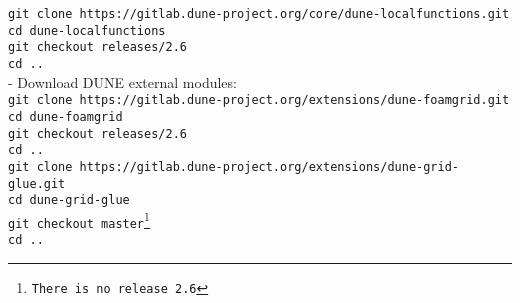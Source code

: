 \texttt{git clone https://gitlab.dune-project.org/core/dune-localfunctions.git}\\
    \hspace{\parindent} \texttt{cd dune-localfunctions}\\
    \hspace{\parindent} \texttt{git checkout releases/2.6}\\
		\hspace{\parindent} \texttt{cd ..}\\
- Download DUNE external modules:\\
\texttt{git clone https://gitlab.dune-project.org/extensions/dune-foamgrid.git}\\
    \hspace{\parindent} \texttt{cd dune-foamgrid}\\
    \hspace{\parindent} \texttt{git checkout releases/2.6}\\
		\hspace{\parindent} \texttt{cd ..}\\
\texttt{git clone https://gitlab.dune-project.org/extensions/dune-grid-glue.git}\\
    \hspace{\parindent} \texttt{cd dune-grid-glue}\\
    \hspace{\parindent} \texttt{git checkout master\footnote{There is no release 2.6}}\\
		\hspace{\parindent} \texttt{cd ..}\\

